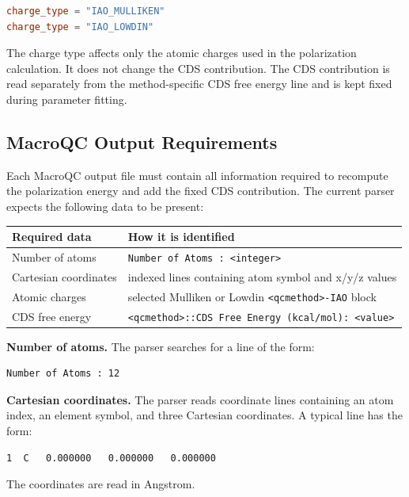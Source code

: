 \documentclass[11pt]{article}
\begin{document}
\begin{lstlisting}[language=toml]
charge_type = "IAO_MULLIKEN"
charge_type = "IAO_LOWDIN"
\end{lstlisting}

The charge type affects only the atomic charges used in the polarization
calculation. It does not change the CDS contribution. The CDS contribution is
read separately from the method-specific CDS free energy line and is kept fixed
during parameter fitting.

\subsection{MacroQC Output Requirements}

Each MacroQC output file must contain all information required to recompute the
polarization energy and add the fixed CDS contribution. The current parser
expects the following data to be present:

\begin{center}
\begin{tabular}{ll}
\toprule
Required data & How it is identified \\
\midrule
Number of atoms & \texttt{Number of Atoms : <integer>} \\
Cartesian coordinates & indexed lines containing atom symbol and x/y/z values \\
Atomic charges & selected Mulliken or Lowdin \texttt{<qcmethod>-IAO} block \\
CDS free energy & \texttt{<qcmethod>::CDS Free Energy (kcal/mol): <value>} \\
\bottomrule
\end{tabular}
\end{center}

\textbf{Number of atoms.}
The parser searches for a line of the form:

\begin{lstlisting}
Number of Atoms : 12
\end{lstlisting}

\textbf{Cartesian coordinates.}
The parser reads coordinate lines containing an atom index, an element symbol,
and three Cartesian coordinates. A typical line has the form:

\begin{lstlisting}
1  C   0.000000   0.000000   0.000000
\end{lstlisting}

The coordinates are read in Angstrom.
\end{document}
